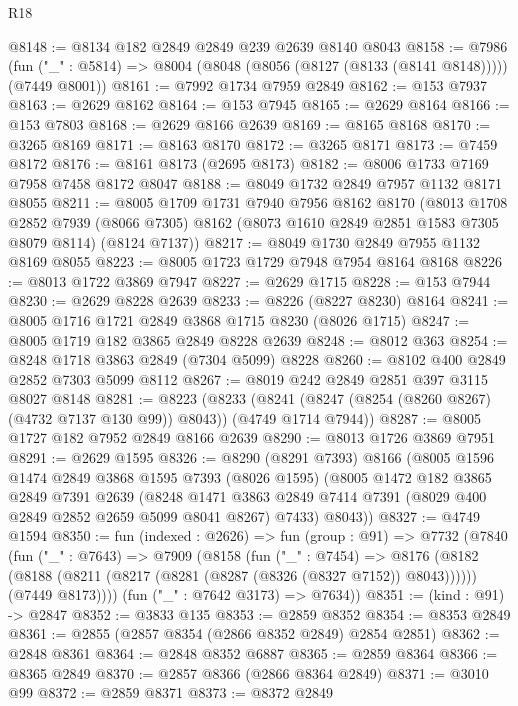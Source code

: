 \begin{lexlean}{R18}
\begin{coremodule}
@8148 := @8134 @182 @2849 @2849 @239 @2639 @8140 @8043
@8158 := @7986
    (fun ("_" : @5814) => @8004 (@8048 (@8056 (@8127 (@8133 (@8141 @8148))))) (@7449 @8001))
@8161 := @7992 @1734 @7959 @2849
@8162 := @153 @7937
@8163 := @2629 @8162
@8164 := @153 @7945
@8165 := @2629 @8164
@8166 := @153 @7803
@8168 := @2629 @8166 @2639
@8169 := @8165 @8168
@8170 := @3265 @8169
@8171 := @8163 @8170
@8172 := @3265 @8171
@8173 := @7459 @8172
@8176 := @8161 @8173 (@2695 @8173)
@8182 := @8006 @1733 @7169 @7958 @7458 @8172 @8047
@8188 := @8049 @1732 @2849 @7957 @1132 @8171 @8055
@8211 := @8005
    @1709
    @1731
    @7940
    @7956
    @8162
    @8170
    (@8013
      @1708
      @2852
      @7939
      (@8066 @7305)
      @8162
      (@8073 @1610 @2849 @2851 @1583 @7305 @8079 @8114)
      (@8124 @7137))
@8217 := @8049 @1730 @2849 @7955 @1132 @8169 @8055
@8223 := @8005 @1723 @1729 @7948 @7954 @8164 @8168
@8226 := @8013 @1722 @3869 @7947
@8227 := @2629 @1715
@8228 := @153 @7944
@8230 := @2629 @8228 @2639
@8233 := @8226 (@8227 @8230) @8164
@8241 := @8005 @1716 @1721 @2849 @3868 @1715 @8230 (@8026 @1715)
@8247 := @8005 @1719 @182 @3865 @2849 @8228 @2639
@8248 := @8012 @363
@8254 := @8248 @1718 @3863 @2849 (@7304 @5099) @8228
@8260 := @8102 @400 @2849 @2852 @7303 @5099 @8112
@8267 := @8019 @242 @2849 @2851 @397 @3115 @8027 @8148
@8281 := @8223
    (@8233 (@8241 (@8247 (@8254 (@8260 @8267) (@4732 @7137 @130 @99)) @8043)) (@4749 @1714 @7944))
@8287 := @8005 @1727 @182 @7952 @2849 @8166 @2639
@8290 := @8013 @1726 @3869 @7951
@8291 := @2629 @1595
@8326 := @8290
    (@8291 @7393)
    @8166
    (@8005
      @1596
      @1474
      @2849
      @3868
      @1595
      @7393
      (@8026 @1595)
      (@8005
        @1472
        @182
        @3865
        @2849
        @7391
        @2639
        (@8248 @1471 @3863 @2849 @7414 @7391 (@8029 @400 @2849 @2852 @2659 @5099 @8041 @8267) @7433)
        @8043))
@8327 := @4749 @1594
@8350 := fun (indexed : @2626) =>
  fun (group : @91) =>
  @7732
    (@7840
      (fun ("_" : @7643) =>
      @7909
        (@8158
          (fun ("_" : @7454) =>
          @8176
            (@8182 (@8188 (@8211 (@8217 (@8281 (@8287 (@8326 (@8327 @7152)) @8043))))))
            (@7449 @8173))))
      (fun ("_" : @7642 @3173) => @7634))
@8351 := (kind : @91) -> @2847
@8352 := @3833 @135
@8353 := @2859 @8352
@8354 := @8353 @2849
@8361 := @2855 (@2857 @8354 (@2866 @8352 @2849) @2854 @2851)
@8362 := @2848 @8361
@8364 := @2848 @8352 @6887
@8365 := @2859 @8364
@8366 := @8365 @2849
@8370 := @2857 @8366 (@2866 @8364 @2849)
@8371 := @3010 @99
@8372 := @2859 @8371
@8373 := @8372 @2849

\end{coremodule}
\end{lexlean}
